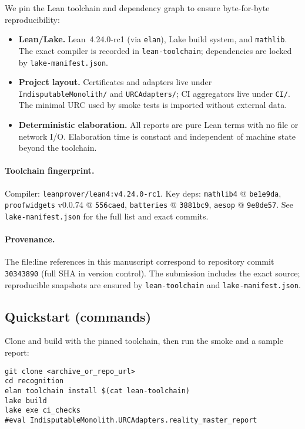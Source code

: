 \documentclass[11pt,a4paper,twoside]{article}
\numberwithin{equation}{section}
\theoremstyle{customthm}
\theoremstyle{customdef}
\theoremstyle{customrem}
\begin{document}
We pin the Lean toolchain and dependency graph to ensure byte-for-byte reproducibility:
\begin{itemize}[leftmargin=*]
  \item \textbf{Lean/Lake.} Lean~4.24.0-rc1 (via \texttt{elan}), Lake build system, and \texttt{mathlib}. The exact compiler is recorded in \texttt{lean-toolchain}; dependencies are locked by \texttt{lake-manifest.json}.
  \item \textbf{Project layout.} Certificates and adapters live under \texttt{IndisputableMonolith/} and \texttt{URCAdapters/}; CI aggregators live under \texttt{CI/}. The minimal URC used by smoke tests is imported without external data.
  \item \textbf{Deterministic elaboration.} All reports are pure Lean terms with no file or network I/O. Elaboration time is constant and independent of machine state beyond the toolchain.
\end{itemize}

\paragraph{Toolchain fingerprint.} Compiler: \texttt{leanprover/lean4:v4.24.0-rc1}. Key deps: \texttt{mathlib4} @ \texttt{be1e9da}, \texttt{proofwidgets} v0.0.74 @ \texttt{556caed}, \texttt{batteries} @ \texttt{3881bc9}, \texttt{aesop} @ \texttt{9e8de57}. See \texttt{lake-manifest.json} for the full list and exact commits.

\paragraph{Provenance.} The file:line references in this manuscript correspond to repository commit \texttt{30343890} (full SHA in version control). The submission includes the exact source; reproducible snapshots are ensured by \texttt{lean-toolchain} and \texttt{lake-manifest.json}.

\subsection{Quickstart (commands)}\label{subsec:repro-quickstart}
Clone and build with the pinned toolchain, then run the smoke and a sample report:
\begin{lstlisting}
git clone <archive_or_repo_url>
cd recognition
elan toolchain install $(cat lean-toolchain)
lake build
lake exe ci_checks
#eval IndisputableMonolith.URCAdapters.reality_master_report
\end{lstlisting}
\end{document}
